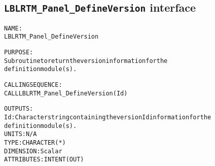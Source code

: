 \subsection{\texttt{LBLRTM\_Panel\_DefineVersion} interface}
  \label{sec:LBLRTM_Panel_DefineVersion_interface}
  \begin{alltt}
 
  NAME:
        LBLRTM_Panel_DefineVersion
 
  PURPOSE:
        Subroutine to return the version information for the
        definition module(s).
 
  CALLING SEQUENCE:
        CALL LBLRTM_Panel_DefineVersion( Id )
 
  OUTPUTS:
        Id:     Character string containing the version Id information for the
                definition module(s).
                UNITS:      N/A
                TYPE:       CHARACTER(*)
                DIMENSION:  Scalar
                ATTRIBUTES: INTENT(OUT)
 
  \end{alltt}
